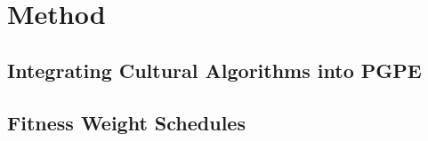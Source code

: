 \documentclass[letterpaper]{article} %
\begin{document}
\section{Method}

\subsection{Integrating Cultural Algorithms into PGPE}

\subsection{Fitness Weight Schedules}
\end{document}

